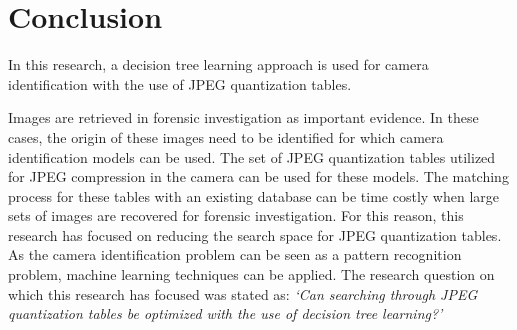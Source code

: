 \chapter{Conclusion} %
\label{ch:cncl} %


In this research, a decision tree learning approach is used for camera identification with the use of JPEG quantization tables. 

Images are retrieved in forensic investigation as important evidence. In these cases, the origin of these images need to be identified for which camera identification models can be used. The set of JPEG quantization tables utilized for JPEG compression in the camera can be used for these models. The matching process for these tables with an existing database can be time costly when large sets of images are recovered for forensic investigation. For this reason, this research has focused on reducing the search space for JPEG quantization tables. As the camera identification problem can be seen as a pattern recognition problem, machine learning techniques can be applied. The research question on which this research has focused was stated as: \textit{`Can searching through JPEG quantization tables be optimized with the use of decision tree learning?'}


